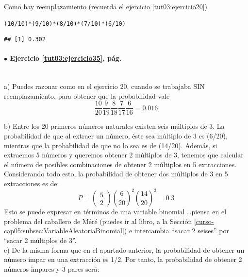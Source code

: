 \documentclass[10pt,a4paper]{article}\usepackage[]{graphicx}\usepackage[]{color}
\makeatletter
\newcommand{\hlnum}[1]{\textcolor[rgb]{0.686,0.059,0.569}{#1}}%
\newcommand{\hlopt}[1]{\textcolor[rgb]{0,0,0}{#1}}%
\newcommand{\hlstd}[1]{\textcolor[rgb]{0.345,0.345,0.345}{#1}}%
\newenvironment{kframe}{%
 \def\at@end@of@kframe{}%
 \ifinner\ifhmode%
  \def\at@end@of@kframe{\end{minipage}}%
  \begin{minipage}{\columnwidth}%
 \fi\fi%
 \def\FrameCommand##1{\hskip\@totalleftmargin \hskip-\fboxsep
 \colorbox{shadecolor}{##1}\hskip-\fboxsep
     \hskip-\linewidth \hskip-\@totalleftmargin \hskip\columnwidth}%
 \MakeFramed {\advance\hsize-\width
   \@totalleftmargin\z@ \linewidth\hsize
   \@setminipage}}%
 {\par\unskip\endMakeFramed%
 \at@end@of@kframe}
\newenvironment{knitrout}{}{} %
\makeatother
\begin{document}
Como hay reemplazamiento (recuerda el ejercicio \ref{tut03:ejercicio20})
\begin{knitrout}
\color{fgcolor}\begin{kframe}
\begin{alltt}
\hlstd{(}\hlnum{10}\hlopt{/}\hlnum{10}\hlstd{)}\hlopt{*}\hlstd{(}\hlnum{9}\hlopt{/}\hlnum{10}\hlstd{)}\hlopt{*}\hlstd{(}\hlnum{8}\hlopt{/}\hlnum{10}\hlstd{)}\hlopt{*}\hlstd{(}\hlnum{7}\hlopt{/}\hlnum{10}\hlstd{)}\hlopt{*}\hlstd{(}\hlnum{6}\hlopt{/}\hlnum{10}\hlstd{)}
\end{alltt}
\begin{verbatim}
## [1] 0.302
\end{verbatim}
\end{kframe}
\end{knitrout}

\paragraph{\bf $\bullet$ Ejercicio \ref{tut03:ejercicio35}, pág. \pageref{tut03:ejercicio35}}
\label{tut03:ejercicio35:sol}\quad\\
a) Puedes razonar como en el ejercicio 20, cuando se trabajaba SIN reemplazamiento, para obtener 
que la probabilidad 
vale $$\frac{10}{20}\frac{9}{19}\frac{8}{18}\frac{7}{17}\frac{6}{16}=0\text{.}016$$

b) Entre los 20 primeros n\'umeros naturales existen seis m\'ultiplos de 3. La probabilidad de que al extraer un n\'umero, \'este sea m\'ultiplo
de 3 es (6/20), mientras que la probabilidad de que no lo sea es de (14/20). Adem\'as, si extraemos 5 n\'umeros y queremos obtener
2 m\'ultiplos de 3, tenemos que calcular el n\'umero de posibles combinaciones de obtener 2 m\'ultiplos en 5 extracciones.
Considerando todo esto, la probabilidad de obtener dos m\'ultiplos de 3 en 5 extracciones es de:
$$P=\left(\begin{array}{c}5 \\ 2 \end{array} \right)\left(\frac{6}{20}\right)^2
\left(\frac{14}{20}\right)^3=0\text{.}3$$
Esto se puede expresar en términos de una variable binomial \dots piensa en el problema del caballero de Méré 
(puedes ir al libro, 
a la Sección \ref{curso-cap05:subsec:VariableAleatoriaBinomial}) e intercambia ``sacar 2 seises'' por ``sacar 2 múltiplos de 3''.\\

c) De la misma forma que en el apartado anterior, la probabilidad de obtener un n\'umero impar en una extracci\'on es 1/2. Por tanto, la 
probabilidad de obtener 2  n\'umeros impares y 3 pares ser\'a:
\end{document}

